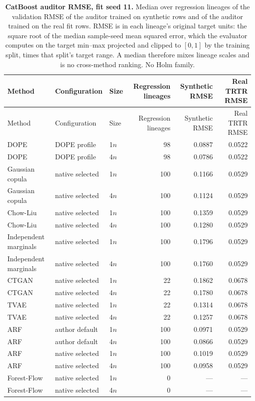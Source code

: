 \begin{longtable}{lllrrr}
\caption{\textbf{CatBoost auditor RMSE, fit seed 11.} Median over regression lineages of the validation RMSE of the auditor trained on synthetic rows and of the auditor trained on the real fit rows. RMSE is in each lineage's original target units: the square root of the median sample-seed mean squared error, which the evaluator computes on the target min--max projected and clipped to $[0,1]$ by the training split, times that split's target range. A median therefore mixes lineage scales and is no cross-method ranking. No Holm family.}\label{tab:review-rmse}\\
\toprule
Method & Configuration & Size & Regression lineages & Synthetic RMSE & Real TRTR RMSE \\
\midrule
\endfirsthead
\toprule
Method & Configuration & Size & Regression lineages & Synthetic RMSE & Real TRTR RMSE \\
\midrule
\endhead
DOPE & DOPE profile & 1$n$ & 98 & 0.0887 & 0.0522 \\
DOPE & DOPE profile & 4$n$ & 98 & 0.0786 & 0.0522 \\
Gaussian copula & native selected & 1$n$ & 100 & 0.1166 & 0.0529 \\
Gaussian copula & native selected & 4$n$ & 100 & 0.1124 & 0.0529 \\
Chow-Liu & native selected & 1$n$ & 100 & 0.1359 & 0.0529 \\
Chow-Liu & native selected & 4$n$ & 100 & 0.1280 & 0.0529 \\
Independent marginals & native selected & 1$n$ & 100 & 0.1796 & 0.0529 \\
Independent marginals & native selected & 4$n$ & 100 & 0.1760 & 0.0529 \\
CTGAN & native selected & 1$n$ & 22 & 0.1862 & 0.0678 \\
CTGAN & native selected & 4$n$ & 22 & 0.1780 & 0.0678 \\
TVAE & native selected & 1$n$ & 22 & 0.1314 & 0.0678 \\
TVAE & native selected & 4$n$ & 22 & 0.1257 & 0.0678 \\
ARF & author default & 1$n$ & 100 & 0.0971 & 0.0529 \\
ARF & author default & 4$n$ & 100 & 0.0866 & 0.0529 \\
ARF & native selected & 1$n$ & 100 & 0.1019 & 0.0529 \\
ARF & native selected & 4$n$ & 100 & 0.0958 & 0.0529 \\
Forest-Flow & native selected & 1$n$ & 0 & --- & --- \\
Forest-Flow & native selected & 4$n$ & 0 & --- & --- \\
\bottomrule
\end{longtable}
